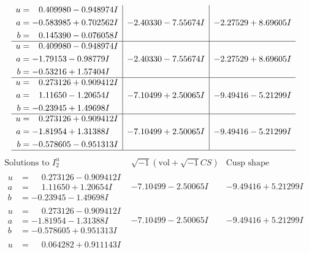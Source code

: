 \documentclass[1p]{elsarticle_modified}
\theoremstyle{definition}
\newcommand{\I}{\sqrt{-1}}
\begin{document}
$$\begin{array}{c|c|c}
\begin{aligned}
u &= \phantom{-}0.409980 - 0.948974 I \\
a &= -0.583985 + 0.702562 I \\
b &= \phantom{-}0.145390 - 0.076058 I\end{aligned}
 & -2.40330 - 7.55674 I & -2.27529 + 8.69605 I \\ \hline\begin{aligned}
u &= \phantom{-}0.409980 - 0.948974 I \\
a &= -1.79153 - 0.98779 I \\
b &= -0.53216 + 1.57404 I\end{aligned}
 & -2.40330 - 7.55674 I & -2.27529 + 8.69605 I \\ \hline\begin{aligned}
u &= \phantom{-}0.273126 + 0.909412 I \\
a &= \phantom{-}1.11650 - 1.20654 I \\
b &= -0.23945 + 1.49698 I\end{aligned}
 & -7.10499 + 2.50065 I & -9.49416 - 5.21299 I \\ \hline\begin{aligned}
u &= \phantom{-}0.273126 + 0.909412 I \\
a &= -1.81954 + 1.31388 I \\
b &= -0.578605 - 0.951313 I\end{aligned}
 & -7.10499 + 2.50065 I & -9.49416 - 5.21299 I\\
 \hline 
 \end{array}$$\newpage$$\begin{array}{c|c|c}  
\text{Solutions to }I^u_{2}& \I (\text{vol} + \sqrt{-1}CS) & \text{Cusp shape}\\
 \hline 
\begin{aligned}
u &= \phantom{-}0.273126 - 0.909412 I \\
a &= \phantom{-}1.11650 + 1.20654 I \\
b &= -0.23945 - 1.49698 I\end{aligned}
 & -7.10499 - 2.50065 I & -9.49416 + 5.21299 I \\ \hline\begin{aligned}
u &= \phantom{-}0.273126 - 0.909412 I \\
a &= -1.81954 - 1.31388 I \\
b &= -0.578605 + 0.951313 I\end{aligned}
 & -7.10499 - 2.50065 I & -9.49416 + 5.21299 I \\ \hline\begin{aligned}
u &= \phantom{-}0.064282 + 0.911143 I \\

\end{aligned}
\end{array}$$
\end{document}
